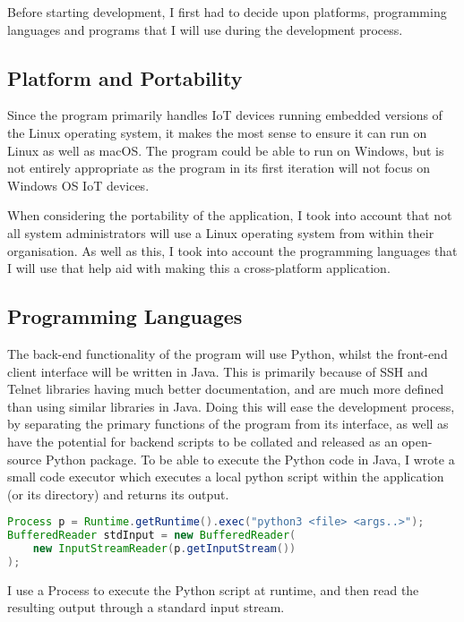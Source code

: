 Before starting development, I first had to decide upon platforms, programming languages and programs that I will use during the development process.

\subsection{Platform and Portability}

Since the program primarily handles IoT devices running embedded versions of the Linux operating system, it makes the most sense to ensure it can run on Linux as well as macOS. The program could be able to run on Windows, but is not entirely appropriate as the program in its first iteration will not focus on Windows OS IoT devices.

\vspace{0.5cm}

When considering the portability of the application, I took into account that not all system administrators will use a Linux operating system from within their organisation. As well as this, I took into account the programming languages that I will use that help aid with making this a cross-platform application.

\subsection{Programming Languages}

The back-end functionality of the program will use Python, whilst the front-end client interface will be written in Java. This is primarily because of SSH and Telnet libraries having much better documentation, and are much more defined than using similar libraries in Java. Doing this will ease the development process, by separating the primary functions of the program from its interface, as well as have the potential for backend scripts to be collated and released as an open-source Python package. To be able to execute the Python code in Java, I wrote a small code executor which executes a local python script within the application (or its directory) and returns its output.

\begin{lstlisting}[language=Java, caption=Executing a Python script in Java]
Process p = Runtime.getRuntime().exec("python3 <file> <args..>");
BufferedReader stdInput = new BufferedReader(
	new InputStreamReader(p.getInputStream())
);
\end{lstlisting}

I use a Process to execute the Python script at runtime, and then read the resulting output through a standard input stream.

